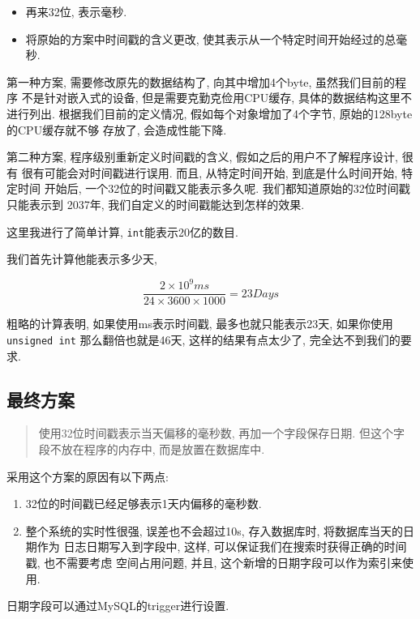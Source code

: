 \begin{itemize}
\item
  再来32位, 表示毫秒.
\item
  将原始的方案中时间戳的含义更改,
  使其表示从一个特定时间开始经过的总毫秒.
\end{itemize}

第一种方案, 需要修改原先的数据结构了, 向其中增加4个byte,
虽然我们目前的程序 不是针对嵌入式的设备, 但是需要克勤克俭用CPU缓存,
具体的数据结构这里不进行列出. 根据我们目前的定义情况,
假如每个对象增加了4个字节, 原始的128byte的CPU缓存就不够 存放了,
会造成性能下降.

第二种方案, 程序级别重新定义时间戳的含义, 假如之后的用户不了解程序设计,
很有 很有可能会对时间戳进行误用. 而且, 从特定时间开始,
到底是什么时间开始, 特定时间 开始后, 一个32位的时间戳又能表示多久呢.
我们都知道原始的32位时间戳只能表示到 2037年,
我们自定义的时间戳能达到怎样的效果.

这里我进行了简单计算, \texttt{int}能表示20亿的数目.

我们首先计算他能表示多少天,

$$ \frac{2 \times 10^{9} ms }{24 \times 3600 \times 1000} = 23 Days$$

粗略的计算表明, 如果使用ms表示时间戳, 最多也就只能表示23天,
如果你使用\texttt{unsigned\ int} 那么翻倍也就是46天,
这样的结果有点太少了, 完全达不到我们的要求.

\subsection{最终方案}

\begin{quote}
使用32位时间戳表示当天偏移的毫秒数, 再加一个字段保存日期.
但这个字段不放在程序的内存中, 而是放置在数据库中.
\end{quote}

采用这个方案的原因有以下两点:

\begin{enumerate}
\def\labelenumi{\arabic{enumi}.}
\item
  32位的时间戳已经足够表示1天内偏移的毫秒数.
\item
  整个系统的实时性很强, 误差也不会超过10s, 存入数据库时,
  将数据库当天的日期作为 日志日期写入到字段中, 这样,
  可以保证我们在搜索时获得正确的时间戳, 也不需要考虑 空间占用问题, 并且,
  这个新增的日期字段可以作为索引来使用.
\end{enumerate}

日期字段可以通过MySQL的trigger进行设置.


